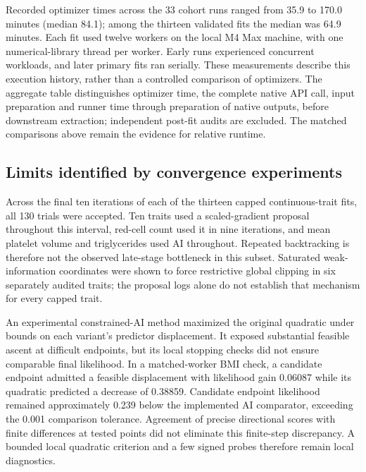 \documentclass[11pt]{article}
\begin{document}
Recorded optimizer times across the 33 cohort runs ranged from 35.9 to 170.0 minutes (median 84.1); among the thirteen validated fits the median was 64.9 minutes. Each fit used twelve workers on the local M4 Max machine, with one numerical-library thread per worker. Early runs experienced concurrent workloads, and later primary fits ran serially. These measurements describe this execution history, rather than a controlled comparison of optimizers. The aggregate table distinguishes optimizer time, the complete native API call, input preparation and runner time through preparation of native outputs, before downstream extraction; independent post-fit audits are excluded. The matched comparisons above remain the evidence for relative runtime.

\subsection{Limits identified by convergence experiments}
Across the final ten iterations of each of the thirteen capped continuous-trait fits, all 130 trials were accepted. Ten traits used a scaled-gradient proposal throughout this interval, red-cell count used it in nine iterations, and mean platelet volume and triglycerides used AI throughout. Repeated backtracking is therefore not the observed late-stage bottleneck in this subset. Saturated weak-information coordinates were shown to force restrictive global clipping in six separately audited traits; the proposal logs alone do not establish that mechanism for every capped trait.

An experimental constrained-AI method maximized the original quadratic under bounds on each variant's predictor displacement. It exposed substantial feasible ascent at difficult endpoints, but its local stopping checks did not ensure comparable final likelihood. In a matched-worker BMI check, a candidate endpoint admitted a feasible displacement with likelihood gain 0.06087 while its quadratic predicted a decrease of 0.38859. Candidate endpoint likelihood remained approximately 0.239 below the implemented AI comparator, exceeding the 0.001 comparison tolerance. Agreement of precise directional scores with finite differences at tested points did not eliminate this finite-step discrepancy. A bounded local quadratic criterion and a few signed probes therefore remain local diagnostics.
\end{document}
